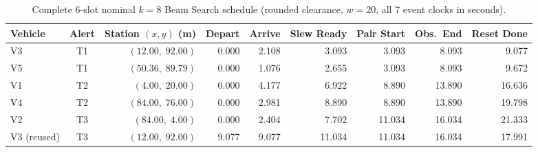 \documentclass[12pt,a4paper]{article}
\begin{document}
\begin{table}[htbp]
\centering\footnotesize
\setlength{\tabcolsep}{4pt}
\caption{Complete 6-slot nominal $k=8$ Beam Search schedule (rounded clearance, $w=20$, all 7 event clocks in seconds).}
\label{tab:app-p22}
\begin{tabular}{@{}lcrrrrrrr@{}}
\toprule
Vehicle & Alert & Station $(x,y)$ (m) & Depart & Arrive & Slew Ready & Pair Start & Obs.\ End & Reset Done\\
\midrule
V3 & T1 & $(12.00,\; 92.00)$ & 0.000 & 2.108 & 3.093 & 3.093 & 8.093 & 9.077\\
V5 & T1 & $(50.36,\; 89.79)$ & 0.000 & 1.076 & 2.655 & 3.093 & 8.093 & 9.672\\
V1 & T2 & $(4.00,\; 20.00)$ & 0.000 & 4.177 & 6.922 & 8.890 & 13.890 & 16.636\\
V4 & T2 & $(84.00,\; 76.00)$ & 0.000 & 2.981 & 8.890 & 8.890 & 13.890 & 19.798\\
V2 & T3 & $(84.00,\; 4.00)$ & 0.000 & 2.404 & 7.702 & 11.034 & 16.034 & 21.333\\
V3 (reused) & T3 & $(12.00,\; 92.00)$ & 9.077 & 9.077 & 11.034 & 11.034 & 16.034 & 17.991\\
\bottomrule
\end{tabular}
\end{table}
\end{document}
